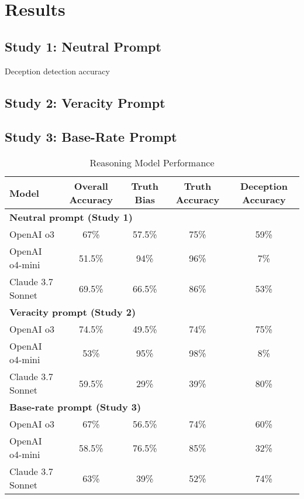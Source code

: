 \documentclass{article}
\begin{document}
\section{Results}

\subsection{Study 1: Neutral Prompt}

Deception detection accuracy 


\subsection{Study 2: Veracity Prompt}

\subsection{Study 3: Base-Rate Prompt}

\begin{table}[ht]
\centering
\caption{Reasoning Model Performance}
\begin{tabular}{lcccc}
\toprule
\textbf{Model} & \textbf{Overall Accuracy} & \textbf{Truth Bias} & \textbf{Truth Accuracy} & \textbf{Deception Accuracy} \\
\midrule
\multicolumn{5}{l}{\textbf{Neutral prompt (Study 1)}} \\
OpenAI o3 & 67\% & 57.5\% & 75\% & 59\% \\
OpenAI o4-mini & 51.5\% & 94\% & 96\% & 7\% \\
Claude 3.7 Sonnet & 69.5\% & 66.5\% & 86\% & 53\% \\
\midrule
\multicolumn{5}{l}{\textbf{Veracity prompt (Study 2)}} \\
OpenAI o3 & 74.5\% & 49.5\% & 74\% & 75\% \\
OpenAI o4-mini & 53\% & 95\% & 98\% & 8\% \\
Claude 3.7 Sonnet & 59.5\% & 29\% & 39\% & 80\% \\
\midrule
\multicolumn{5}{l}{\textbf{Base-rate prompt (Study 3)}} \\
OpenAI o3 & 67\% & 56.5\% & 74\% & 60\% \\
OpenAI o4-mini & 58.5\% & 76.5\% & 85\% & 32\% \\
Claude 3.7 Sonnet & 63\% & 39\% & 52\% & 74\% \\
\bottomrule
\end{tabular}
\label{tab:model_performance}
\end{table}
\end{document}
